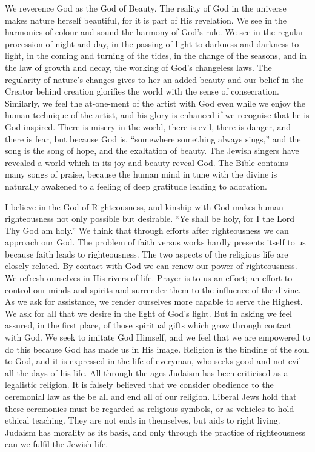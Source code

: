 We reverence God as the God of Beauty. The
reality of God in the universe makes nature herself
beautiful, for it is part of His revelation. We see in the
harmonies of colour and sound the harmony of God’s rule.
We see in the regular procession of night and day, in the
passing of light to darkness and darkness to light, in the
coming and turning of the tides, in the change of the
seasons, and in the law of growth and decay, the working
of God’s changeless laws. The regularity of nature’s
changes gives to her an added beauty and our belief in the
Creator behind creation glorifies the world with the sense
of consecration. Similarly, we feel the at-one-ment of
the artist with God even while we enjoy the human technique
of the artist, and his glory is enhanced if we recognise
that he is God-inspired. There is misery in the world,
there is evil, there is danger, and there is fear, but
because God is, “somewhere something always sings,”
and the song is the song of hope, and the exaltation of
beauty. The Jewish singers have revealed a world which
in its joy and beauty reveal God. The Bible contains
many songs of praise, because the human mind in tune
with the divine is naturally awakened to a feeling of deep
gratitude leading to adoration.

I believe in the God of Righteousness, and kinship
with God makes human righteousness not only possible
but desirable. “Ye shall be holy, for I the Lord Thy
God am holy.” We think that through efforts after
righteousness we can approach our God. The problem
of faith versus works hardly presents itself to us because
faith leads to righteousness. The two aspects of the
religious life are closely related. By contact with God
we can renew our power of righteousness. We refresh
ourselves in His rivers of life. Prayer is to us an effort;
an effort to control our minds and spirits and surrender
them to the influence of the divine. As we ask for assistance,
we render ourselves more capable to serve the
Highest. We ask for all that we desire in the light of
God's light. But in asking we feel assured, in the first
place, of those spiritual gifts which grow through contact
with God. We seek to imitate God Himself, and we feel
that we are empowered to do this because God has made
us in His image. Religion is the binding of the soul to
God, and it is expressed in the life of everyman, who
seeks good and not evil all the days of his life. All
through the ages Judaism has been criticised as a legalistic
religion. It is falsely believed that we consider obedience
to the ceremonial law as the be all and end all of our
religion. Liberal Jews hold that these ceremonies must
be regarded as religious symbols, or as vehicles to hold
ethical teaching. They are not ends in themselves, but
aids to right living. Judaism has morality as its basis,
and only through the practice of righteousness can we
fulfil the Jewish life.


